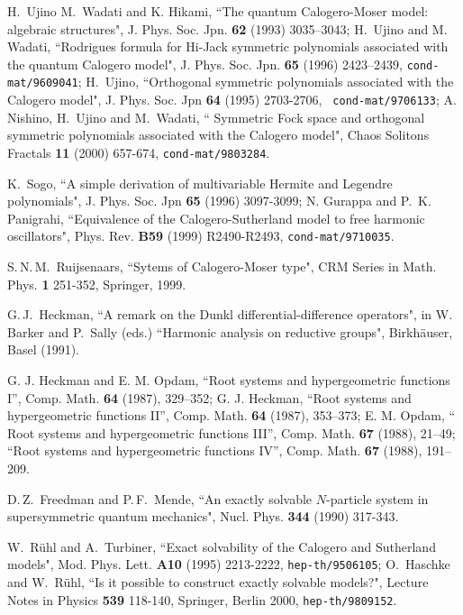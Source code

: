 \documentclass[a4paper,12pt]{article}
\begin{document}
\begin{thebibliography}{99}
 H.\, Ujino  M.\, Wadati and K. Hikami, ``The quantum Calogero-Moser
model: algebraic structures", J. Phys. Soc. Jpn.
 {\bf 62} (1993) 3035--3043;
 H.\, Ujino and M.\, Wadati, ``Rodrigues formula for Hi-Jack symmetric
 polynomials associated with the quantum Calogero model", J. Phys. Soc.
Jpn. {\bf 65} (1996) 2423--2439, {\tt cond-mat/9609041};
  H.\, Ujino, ``Orthogonal symmetric polynomials associated with the
Calogero
  model",  J. Phys. Soc. Jpn {\bf 64}  (1995) 2703-2706, {\tt
cond-mat/9706133};   A.\, Nishino, H.\, Ujino and M.\, Wadati,
 `` Symmetric Fock space and orthogonal symmetric polynomials associated
 with the Calogero model",  Chaos Solitons Fractals {\bf 11}  (2000)
657-674, {\tt cond-mat/9803284}.


K.\, Sogo, ``A simple derivation of multivariable Hermite and
Legendre polynomials", J. Phys. Soc. Jpn {\bf 65}  (1996) 3097-3099;
N. Gurappa and P.\, K. Panigrahi,
``Equivalence of the Calogero-Sutherland model to free harmonic
oscillators", Phys. Rev. {\bf B59} (1999) R2490-R2493,
{\tt cond-mat/9710035}.

S.\,N.\,M.\, Ruijsenaars, ``Sytems of Calogero-Moser type",
CRM Series in Math. Phys. {\bf 1} 251-352, Springer, 1999.


G.\,J.\, Heckman, ``A remark on the Dunkl differential-difference
operators", in W.\, Barker and P.\, Sally (eds.) ``Harmonic analysis
on reductive groups", Birkh\"auser, Basel (1991).

 G. J. Heckman and E. M. Opdam, ``Root
systems and hypergeometric functions I'', Comp. Math. {\bf
64} (1987), 329--352;
G. J. Heckman, ``Root systems and
hypergeometric functions II'', Comp. Math. {\bf 64}
(1987), 353--373;
E. M. Opdam, `` Root systems and
hypergeometric functions III'', Comp. Math. {\bf 67}
(1988), 21--49;
``Root systems and
hypergeometric functions IV'', Comp.  Math. {\bf 67}
(1988), 191--209.



D.\,Z.\, Freedman and P.\,F.\, Mende, ``An exactly solvable \(N\)-particle
system
in supersymmetric quantum mechanics", Nucl. Phys. {\bf 344} (1990)
317-343.

W.\, R\"uhl and A.\, Turbiner, ``Exact solvability of the Calogero and
Sutherland models", Mod. Phys. Lett. {\bf A10} (1995) 2213-2222,
{\tt hep-th/9506105};
O.\, Haschke  and W.\, R\"uhl, ``Is it possible to construct exactly
solvable models?", Lecture Notes in Physics {\bf 539} 118-140,
Springer, Berlin 2000, {\tt hep-th/9809152}.


\end{thebibliography}
\end{document}
